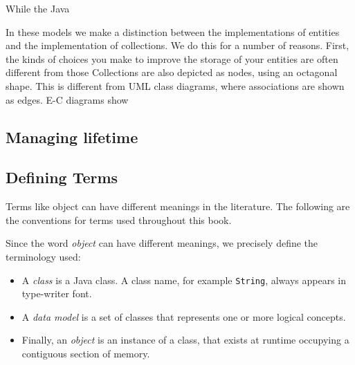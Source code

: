 While the Java 

In these models we make a distinction between the implementations of entities and the implementation of collections.  We do this for a number of reasons.  First, the kinds of choices you make to improve the storage of your entities are often different from those Collections are also depicted as nodes, using an octagonal shape.  This is different from UML class diagrams, where associations are shown as edges. E-C diagrams show 

\subsection{Managing lifetime}


\subsection{Defining Terms}

Terms like object can have different meanings in the literature.  The following are the conventions for terms used throughout this book.

Since the word \textit{object} can have different meanings, we precisely define the terminology used:
\begin{itemize}
\item A \textit{class} is a Java class. A class name, for example \texttt{String}, always appears in type-writer font. 
\item A \textit{data model} is a set of classes that represents one or more logical concepts.
\item Finally, an \textit{object} is an instance of a class, that exists at runtime occupying a contiguous section of memory.
\end{itemize} 







 


